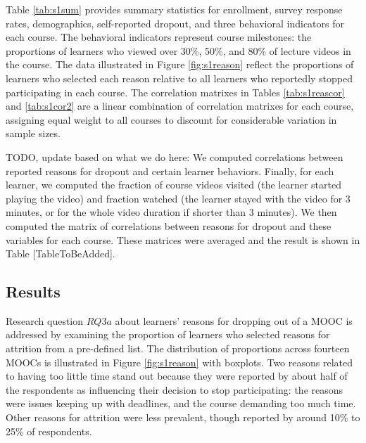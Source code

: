 \documentclass{sigchi}\usepackage[]{graphicx}\usepackage[]{color}
\begin{document}
Table \ref{tab:s1sum} provides summary statistics for enrollment, survey response rates, demographics, self-reported dropout, and three behavioral indicators for each course. The behavioral indicators represent course milestones: the proportions of learners who viewed over 30\%, 50\%, and 80\% of lecture videos in the course. The data illustrated in Figure \ref{fig:s1reason} reflect the proportions of learners who selected each reason relative to all learners who reportedly stopped participating in each course. The correlation matrixes in Tables \ref{tab:s1reascor} and \ref{tab:s1cor2} are a linear combination of correlation matrixes for each course, assigning equal weight to all courses to discount for considerable variation in sample sizes.

TODO, update based on what we do here: We computed correlations between reported reasons for dropout and certain learner behaviors. Finally, for each learner, we computed the fraction of course videos visited (the learner started playing the video) and fraction watched (the learner stayed with the video for 3 minutes, or for the whole video duration if shorter than 3 minutes). We then computed the matrix of correlations between reasons for dropout and these variables for each course. These matrices were averaged and the result is shown in Table [TableToBeAdded].


\subsection{Results}

Research question $RQ3a$ about learners' reasons for dropping out of a MOOC is addressed by examining the proportion of learners who selected reasons for attrition from a pre-defined list. The distribution of proportions across fourteen MOOCs is illustrated in Figure \ref{fig:s1reason} with boxplots. Two reasons related to having too little time stand out because they were reported by about half of the respondents as influencing their decision to stop participating: the reasons were issues keeping up with deadlines, and the course demanding too much time. Other reasons for attrition were less prevalent, though reported by around 10\% to 25\% of respondents.
\end{document}
